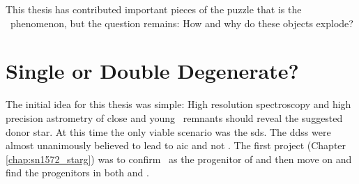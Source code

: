 This thesis has contributed important pieces of the puzzle that is the \snia\ phenomenon, but the question remains: How and why do these objects explode?

\section{Single or Double Degenerate?}
The initial idea for this thesis was simple: High resolution spectroscopy and high precision astrometry of close and young \snia\ remnants should reveal the suggested donor star. At this time the only viable scenario was the \gls{sds}. The \glspl{dds} were almost unanimously believed to lead to \gls{aic} and not \sneia. The first project (Chapter \ref{chap:sn1572_starg}) was to confirm \starg\ as the progenitor of  and then move on and find the progenitors in both  and .

